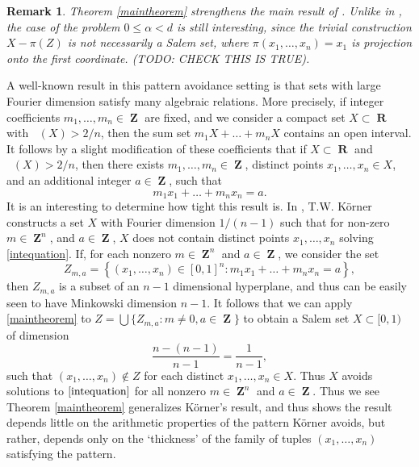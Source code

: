 \documentclass[12pt,reqno]{article}
\numberwithin{equation}{section}
\DeclareMathOperator{\fordim}{\dim_{\mathbf{F}}}
\DeclareMathOperator{\RR}{\mathbf{R}}
\DeclareMathOperator{\ZZ}{\mathbf{Z}}
\newtheorem*{remark}{Remark}
\begin{document}
\begin{remark}
    Theorem \ref{maintheorem} strengthens the main result of \cite{OurPaper}. Unlike in \cite{OurPaper}, the case of the problem $0 \leq \alpha < d$ is still interesting, since the trivial construction $X - \pi(Z)$ is not necessarily a Salem set, where $\pi(x_1, \dots, x_n) = x_1$ is projection onto the first coordinate. (TODO: CHECK THIS IS TRUE).
\end{remark}

A well-known result in this pattern avoidance setting is that sets with large Fourier dimension satisfy many algebraic relations. More precisely, if integer coefficients $m_1, \dots, m_n \in \ZZ$ are fixed, and we consider a compact set $X \subset \RR$ with $\fordim(X) > 2/n$, then the sum set $m_1 X + \dots + m_n X$ contains an open interval. It follows by a slight modification of these coefficients that if $X \subset \RR$ and $\fordim(X) > 2/n$, then there exists $m_1, \dots, m_n \in \ZZ$, distinct points $x_1, \dots, x_n \in X$, and an additional integer $a \in \ZZ$, such that
%
\begin{equation} \label{intequation}
    m_1 x_1 + \dots + m_n x_n = a.
\end{equation}
%
It is an interesting to determine how tight this result is. In \cite{Korner2}, T.W. K\"{o}rner constructs a set $X$ with Fourier dimension $1/(n-1)$ such that for non-zero $m \in \ZZ^n$, and $a \in \ZZ$, $X$ does not contain distinct points $x_1, \dots, x_n$ solving \eqref{intequation}. If, for each nonzero $m \in \ZZ^n$ and $a \in \ZZ$, we consider the set
%
\[ Z_{m,a} = \left\{ (x_1, \dots, x_n) \in [0,1]^n : m_1x_1 + \dots + m_n x_n = a \right\}, \]
%
then $Z_{m,a}$ is a subset of an $n-1$ dimensional hyperplane, and thus can be easily seen to have Minkowski dimension $n-1$. It follows that we can apply \ref{maintheorem} to $Z = \bigcup \{ Z_{m,a} : m \neq 0, a \in \ZZ \}$ to obtain a Salem set $X \subset [0,1)$ of dimension
%
\[ \frac{n - (n-1)}{n - 1} = \frac{1}{n-1}, \]
%
such that $(x_1, \dots, x_n) \not \in Z$ for each distinct $x_1, \dots, x_n \in X$. Thus $X$ avoids solutions to $\eqref{intequation}$ for all nonzero $m \in \ZZ^n$ and $a \in \ZZ$. Thus we see Theorem \ref{maintheorem} generalizes K\"{o}rner's result, and thus shows the result depends little on the arithmetic properties of the pattern K\"{o}rner avoids, but rather, depends only on the `thickness' of the family of tuples $(x_1, \dots, x_n)$ satisfying the pattern.
\end{document}
